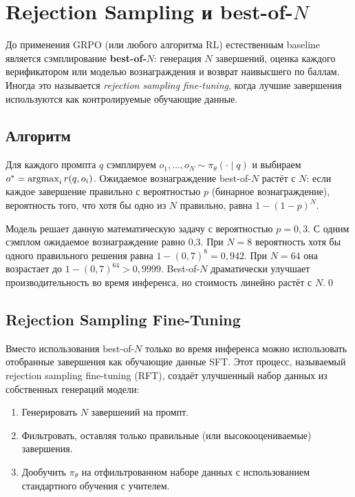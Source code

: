 \section{Rejection Sampling и best-of-$N$}
\label{sec:rejection-sampling}


До применения GRPO (или любого алгоритма RL) естественным baseline является сэмплирование \textbf{best-of-$N$}: генерация $N$ завершений, оценка каждого верификатором или моделью вознаграждения и возврат наивысшего по баллам. Иногда это называется \emph{rejection sampling fine-tuning}, когда лучшие завершения используются как контролируемые обучающие данные.

\subsection{Алгоритм}

Для каждого промпта $q$ сэмплируем $o_1, \ldots, o_N \sim \pi_\theta(\cdot \mid q)$ и выбираем $o^* = \operatorname*{argmax}_{i} r(q, o_i)$. Ожидаемое вознаграждение best-of-$N$ растёт с $N$: если каждое завершение правильно с вероятностью $p$ (бинарное вознаграждение), вероятность того, что хотя бы одно из $N$ правильно, равна $1 - (1-p)^N$.

\begin{example}
\label{ex:best-of-n}
Модель решает данную математическую задачу с вероятностью $p = 0{,}3$. С одним сэмплом ожидаемое вознаграждение равно 0,3. При $N = 8$ вероятность хотя бы одного правильного решения равна $1 - (0{,}7)^8 = 0{,}942$. При $N = 64$ она возрастает до $1 - (0{,}7)^{64} > 0{,}9999$. Best-of-$N$ драматически улучшает производительность во время инференса, но стоимость линейно растёт с $N$.\qed
\end{example}

\subsection{Rejection Sampling Fine-Tuning}

Вместо использования best-of-$N$ только во время инференса можно использовать отобранные завершения как обучающие данные SFT. Этот процесс, называемый rejection sampling fine-tuning (RFT), создаёт улучшенный набор данных из собственных генераций модели:
\begin{enumerate}[leftmargin=*]
  \item Генерировать $N$ завершений на промпт.
  \item Фильтровать, оставляя только правильные (или высокооцениваемые) завершения.
  \item Дообучить $\pi_\theta$ на отфильтрованном наборе данных с использованием стандартного обучения с учителем.
\end{enumerate}

